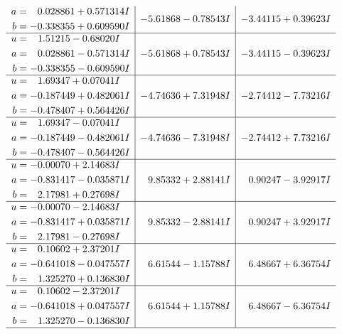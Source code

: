 \documentclass[1p]{elsarticle_modified}
\theoremstyle{definition}
\begin{document}
$$\begin{array}{c|c|c}
\begin{aligned}
a &= \phantom{-}0.028861 + 0.571314 I \\
b &= -0.338355 + 0.609590 I\end{aligned}
 & -5.61868 - 0.78543 I & -3.44115 + 0.39623 I \\ \hline\begin{aligned}
u &= \phantom{-}1.51215 - 0.68020 I \\
a &= \phantom{-}0.028861 - 0.571314 I \\
b &= -0.338355 - 0.609590 I\end{aligned}
 & -5.61868 + 0.78543 I & -3.44115 - 0.39623 I \\ \hline\begin{aligned}
u &= \phantom{-}1.69347 + 0.07041 I \\
a &= -0.187449 + 0.482061 I \\
b &= -0.478407 + 0.564426 I\end{aligned}
 & -4.74636 + 7.31948 I & -2.74412 - 7.73216 I \\ \hline\begin{aligned}
u &= \phantom{-}1.69347 - 0.07041 I \\
a &= -0.187449 - 0.482061 I \\
b &= -0.478407 - 0.564426 I\end{aligned}
 & -4.74636 - 7.31948 I & -2.74412 + 7.73216 I \\ \hline\begin{aligned}
u &= -0.00070 + 2.14683 I \\
a &= -0.831417 - 0.035871 I \\
b &= \phantom{-}2.17981 + 0.27698 I\end{aligned}
 & \phantom{-}9.85332 + 2.88141 I & \phantom{-}0.90247 - 3.92917 I \\ \hline\begin{aligned}
u &= -0.00070 - 2.14683 I \\
a &= -0.831417 + 0.035871 I \\
b &= \phantom{-}2.17981 - 0.27698 I\end{aligned}
 & \phantom{-}9.85332 - 2.88141 I & \phantom{-}0.90247 + 3.92917 I \\ \hline\begin{aligned}
u &= \phantom{-}0.10602 + 2.37201 I \\
a &= -0.641018 - 0.047557 I \\
b &= \phantom{-}1.325270 + 0.136830 I\end{aligned}
 & \phantom{-}6.61544 - 1.15788 I & \phantom{-}6.48667 + 6.36754 I \\ \hline\begin{aligned}
u &= \phantom{-}0.10602 - 2.37201 I \\
a &= -0.641018 + 0.047557 I \\
b &= \phantom{-}1.325270 - 0.136830 I\end{aligned}
 & \phantom{-}6.61544 + 1.15788 I & \phantom{-}6.48667 - 6.36754 I\\
 \hline 
 \end{array}$$\newpage
\end{document}
